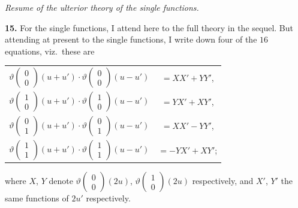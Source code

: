 \documentclass[12pt,a4paper]{article}
\theoremstyle{definition}
\begin{document}
\vspace{1em}

\begin{center}
\textit{Resume of the ulterior theory of the single functions.}
\end{center}

\vspace{0.5em}

\noindent\textbf{15.}\quad
For the single functions, I attend here to the full theory in the sequel. But attending at present to the single functions, I write down four of the $16$ equations, viz.\ these are

\begin{center}
\begin{tabular}{c@{\qquad}c}
$\vartheta\begin{pmatrix} 0 \\ 0 \end{pmatrix}(u + u') \cdot \vartheta\begin{pmatrix} 0 \\ 0 \end{pmatrix}(u - u')$ & $= XX' + YY'$, \\
$\vartheta\begin{pmatrix} 1 \\ 0 \end{pmatrix}(u + u') \cdot \vartheta\begin{pmatrix} 1 \\ 0 \end{pmatrix}(u - u')$ & $= YX' + XY'$, \\
$\vartheta\begin{pmatrix} 0 \\ 1 \end{pmatrix}(u + u') \cdot \vartheta\begin{pmatrix} 0 \\ 1 \end{pmatrix}(u - u')$ & $= XX' - YY'$, \\
$\vartheta\begin{pmatrix} 1 \\ 1 \end{pmatrix}(u + u') \cdot \vartheta\begin{pmatrix} 1 \\ 1 \end{pmatrix}(u - u')$ & $= -YX' + XY'$;
\end{tabular}
\end{center}

\noindent where $X$, $Y$ denote $\vartheta\begin{pmatrix} 0 \\ 0 \end{pmatrix}(2u)$, $\vartheta\begin{pmatrix} 1 \\ 0 \end{pmatrix}(2u)$ respectively, and $X'$, $Y'$ the same functions of $2u'$ respectively.
\end{document}
